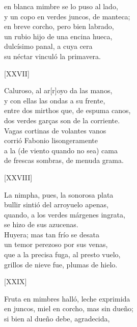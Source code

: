 \documentclass[11pt,a4paper,twoside]{article}
\begin{document}
en blanca mimbre se lo puso al lado,\\
y un copo en verdes juncos, de manteca;\\
en breve corcho, pero bien labrado,\\
un rubio hijo de una encina hueca,\\
dulcísimo panal, a cuya cera\\
su néctar vinculó la primavera.\pend
\begin{center}
	[XXVII]
\end{center}\pstart
Caluroso, al ar[r]oyo da las manos,\\
y con ellas las ondas a su frente,\\
entre dos mirthos que, de espuma canos,\\
dos verdes garças son de la corriente.\\
Vagas cortinas de volantes vanos\\
corrió Fabonio lisongeramente\\
a la (de viento quando no sea) cama\\
de frescas sombras, de menuda grama.\pend
\begin{center}
	[XXVIII]
\end{center}\pstart
La nimpha, pues, la sonorosa plata\\
bullir sintió del arroyuelo apenas,\\
quando, a los verdes márgenes ingrata,\\
 se hizo de sus azucenas.\\
Huyera; mas tan frío se desata\\
un temor perezoso por sus venas,\\
que a la precisa fuga, al presto vuelo,\\
grillos de nieve fue, plumas de hielo.\pend
\begin{center}
	[XXIX]
\end{center}\pstart
Fruta en mimbres halló, leche exprimida\\
en juncos, miel en corcho, mas sin dueño;\\
si bien al dueño debe, agradecida,\\
\end{document}
